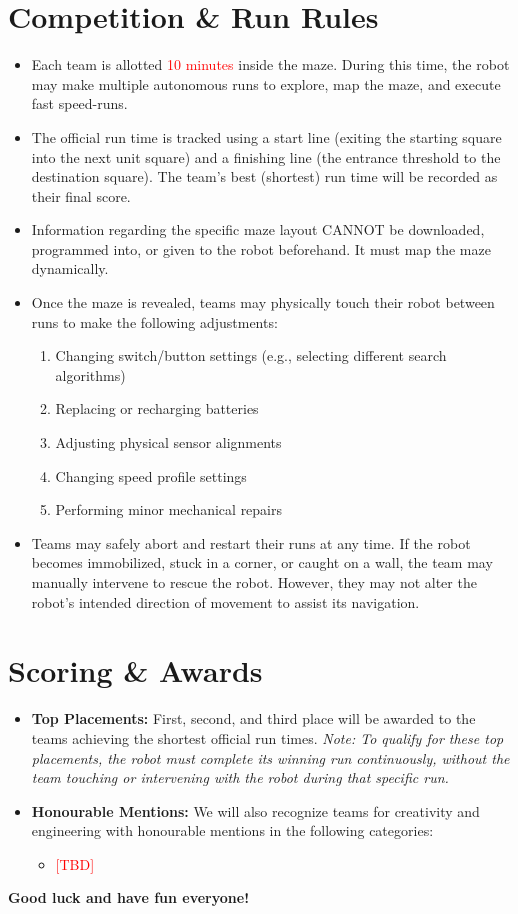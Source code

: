 \documentclass[11pt]{article}
\begin{document}
\section*{Competition \& Run Rules}
\begin{itemize}
    \item Each team is allotted \textcolor{red} {10 minutes} inside the maze. During this time, the robot may make multiple autonomous runs to explore, map the maze, and execute fast speed-runs.
    \item The official run time is tracked using a start line (exiting the starting square into the next unit square) and a finishing line (the entrance threshold to the destination square). The team's best (shortest) run time will be recorded as their final score.
    \item Information regarding the specific maze layout CANNOT be downloaded, programmed into, or given to the robot beforehand. It must map the maze dynamically.
    \item Once the maze is revealed, teams may physically touch their robot between runs to make the following adjustments:
    \begin{enumerate}[label=\arabic*.]
        \item Changing switch/button settings (e.g., selecting different search algorithms)
        \item Replacing or recharging batteries
        \item Adjusting physical sensor alignments
        \item Changing speed profile settings
        \item Performing minor mechanical repairs
    \end{enumerate}
    \item Teams may safely abort and restart their runs at any time. If the robot becomes immobilized, stuck in a corner, or caught on a wall, the team may manually intervene to rescue the robot. However, they may not alter the robot's intended direction of movement to assist its navigation.
\end{itemize}

\section*{Scoring \& Awards}
\begin{itemize}
    \item \textbf{Top Placements:} First, second, and third place will be awarded to the teams achieving the shortest official run times. \textit{Note: To qualify for these top placements, the robot must complete its winning run continuously, without the team touching or intervening with the robot during that specific run.}
    \item \textbf{Honourable Mentions:} We will also recognize teams for creativity and engineering with honourable mentions in the following categories:
    \begin{itemize}
        \item \textcolor{red}{[TBD]}
    \end{itemize}
\end{itemize}

\vspace{1em}
\noindent \textbf{Good luck and have fun everyone!}
\end{document}
